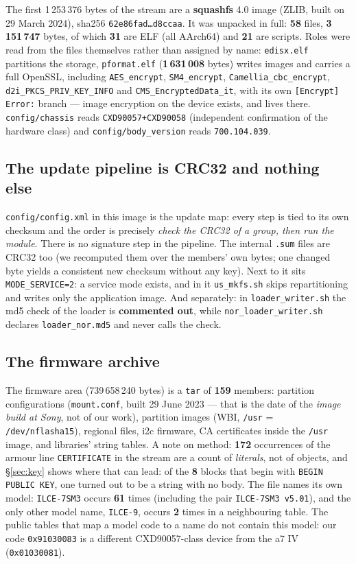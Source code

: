 \documentclass[12pt]{article}
\newcommand{\code}[1]{\texttt{\small #1}}
\newcommand{\lc}[1]{\texttt{\small #1}}
\newcommand{\hx}[1]{\texttt{\footnotesize #1}}
\begin{document}
The first 1\,253\,376 bytes of the stream are a \textbf{squashfs} 4.0 image (ZLIB, built on
29 March 2024), sha256 \hx{62e86fad\ldots d8ccaa}. It was unpacked in full: \textbf{58}
files, \textbf{3\,151\,747} bytes, of which \textbf{31} are ELF (all AArch64) and
\textbf{21} are scripts. Roles were read from the files themselves rather than assigned by
name: \code{edisx.elf} partitions the storage, \code{pformat.elf} (\textbf{1\,631\,008}
bytes) writes images and carries a full OpenSSL, including \code{AES\_encrypt},
\code{SM4\_encrypt}, \lc{Camellia\_cbc\_encrypt},
\lc{d2i\_PKCS\_PRIV\_K\allowbreak EY\_INFO} and \code{CMS\_EncryptedData\_it}, with its own
\code{[Encrypt] Error:} branch --- image encryption on the device exists, and lives there.
\code{config/chassis} reads \code{CXD90057+CXD90058} (independent confirmation of the
hardware class) and \lc{config/b\allowbreak ody\_vers\allowbreak ion} reads \code{700.104.039}.

\subsection{The update pipeline is CRC32 and nothing else}

\code{config/config.xml} in this image is the update map: every step is tied to its own
checksum and the order is precisely \emph{check the CRC32 of a group, then run the module}.
There is no signature step in the pipeline. The internal \code{.sum} files are CRC32 too (we
recomputed them over the members' own bytes; one changed byte yields a consistent new
checksum without any key). Next to it sits \code{MODE\_SERVICE=2}: a service mode exists, and
in it \code{us\_mkfs.sh} skips repartitioning and writes only the application image. And
separately: in \code{loader\_writer.sh} the md5 check of the loader is
\textbf{commented out}, while \lc{nor\_load\allowbreak er\_write\allowbreak r.sh} declares \code{loader\_nor.md5}
and never calls the check.

\subsection{The firmware archive}

The firmware area (739\,658\,240 bytes) is a \code{tar} of \textbf{159} members: partition
configurations (\code{mount.conf}, built 29 June 2023 --- that is the date of the
\emph{image build at Sony}, not of our work), partition images (WBI, \code{/usr} = \code{/dev/nflasha15}), regional
files, i2c firmware, CA certificates inside the \code{/usr} image, and libraries' string
tables. A note on method: \textbf{172} occurrences of the armour line \code{CERTIFICATE} in
the stream are a count of \emph{literals}, not of objects, and \S\ref{sec:key} shows where
that can lead: of the \textbf{8} blocks that begin with \code{BEGIN PUBLIC KEY}, one turned
out to be a string with no body. The file names its own model: \code{ILCE-7SM3} occurs
\textbf{61} times (including the pair \code{ILCE-7SM3 v5.01}), and the only other model name,
\code{ILCE-9}, occurs \textbf{2} times in a neighbouring table. The public tables that map a
model code to a name do not contain this model: our code \code{0x91030083} is a different
CXD90057-class device from the a7 IV (\code{0x01030081}).
\end{document}
